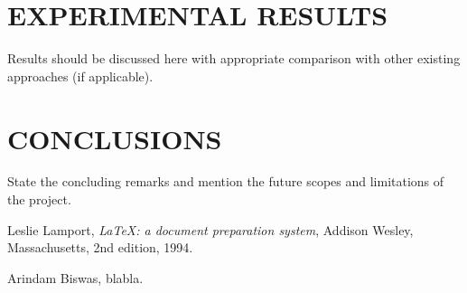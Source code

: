 \documentclass[12pt]{article}
\begin{document}
\section{EXPERIMENTAL RESULTS}
Results should be discussed here with appropriate comparison with other existing approaches (if applicable).




\newpage




\section{CONCLUSIONS}
State the concluding remarks and mention the future scopes and limitations of the project.




\newpage




\begin{thebibliography}{9}
	Leslie Lamport,
	\emph{\LaTeX: a document preparation system},
	Addison Wesley, Massachusetts,
	2nd edition,
	1994.

	Arindam Biswas, blabla.
	
\end{thebibliography}

\newpage



%
%
\end{document}
